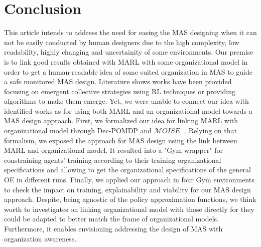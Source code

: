 \documentclass[runningheads]{llncs}
\begin{document}
\section{Conclusion}



This article intends to address the need for easing the MAS designing when it can not be easily conducted by human designers due to the high complexity, low readability, highly changing and uncertainity of some environments. Our premise is to link good results obtained with MARL with some organizational model in order to get a human-readable idea of some suited organization in MAS to guide a safe monitored MAS design. Literature shows works have been provided focusing on emergent collective strategies using RL techniques or providing algorithms to make them emerge. Yet, we were unable to connect our idea with identified works as for using both MARL and an organizational model towards a MAS design approach. First, we formalized our idea for linking MARL with organizational model through Dec-POMDP and $\mathcal{M}OISE^+$. Relying on that formalism, we exposed the approach for MAS design using the link between MARL and organizational model. It resulted into a "Gym wrapper" for constraining agents' training according to their training organizational specifications and allowing to get the organizational specifications of the general OE in different runs. Finally, we applied our approach in four Gym environments to check the impact on training, explainability and viability for our MAS design approach. Despite, being agnostic of the policy approximation functions, we think worth to investigates on linking organizational model with those directly for they could be adapted to better match the frame of organizational models. Furthermore, it enables envisioning addressing the design of MAS with organization awareness.
\end{document}
